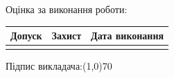 \documentclass[12pt]{extreport}
\begin{document}
\vspace{350pt}
{\fontsize{14}{16.2}\selectfont
Оцінка за виконання роботи:
\smallskip

\renewcommand{\arraystretch}{4}
\begin{tabular}{|c|c|c|}
	\hline
	\hspace{15pt} Допуск \hspace{15pt} & \hspace{15pt} Захист \hspace{15pt}
	& \hspace{15pt} Дата виконання \hspace{15pt}\\
	\hline
	 &  & \\
	\hline

\end{tabular}

\bigskip

	\begin{flushright}
		Підпис викладача:\line(1,0){70}\hspace{100pt}\hphantom{1pt}
	\end{flushright}
	}
\end{document}
